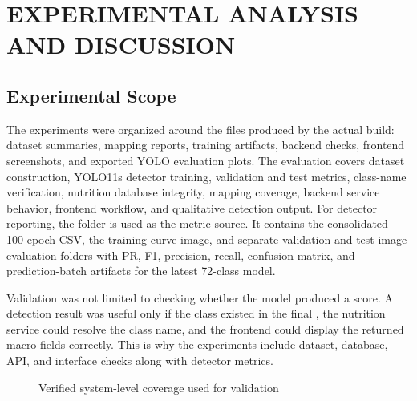 \chapter{EXPERIMENTAL ANALYSIS AND DISCUSSION}

\section{Experimental Scope}

The experiments were organized around the files produced by the actual build: dataset summaries, mapping reports, training artifacts, backend checks, frontend screenshots, and exported YOLO evaluation plots. The evaluation covers dataset construction, YOLO11s detector training, validation and test metrics, class-name verification, nutrition database integrity, mapping coverage, backend service behavior, frontend workflow, and qualitative detection output. For detector reporting, the  folder is used as the metric source. It contains the consolidated 100-epoch CSV, the training-curve image, and separate validation and test image-evaluation folders with PR, F1, precision, recall, confusion-matrix, and prediction-batch artifacts for the latest 72-class model.

Validation was not limited to checking whether the model produced a score. A detection result was useful only if the class existed in the final , the nutrition service could resolve the class name, and the frontend could display the returned macro fields correctly. This is why the experiments include dataset, database, API, and interface checks along with detector metrics.

\begin{figure}[H]
\centering
{}
\caption{Verified system-level coverage used for validation}
\label{fig:validation-coverage-chart}
\end{figure}

